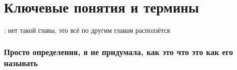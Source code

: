 \section{Ключевые понятия и термины}

\TODO: нет такой главы, это всё по другим главам расползётся

\begin{definition}

\TODO

\end{definition}

\begin{definition}

\TODO

\end{definition}


\subsubsection{Просто определения, я не придумала, как это что это как его называть}

\begin{definition}
    \TODO
\end{definition}
